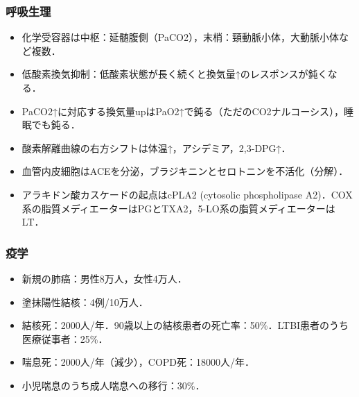 \subsubsection{呼吸生理}
\begin{itemize}

\item 化学受容器は中枢：延髄腹側（PaCO2），末梢：頸動脈小体，大動脈小体など複数．
\item 低酸素換気抑制：低酸素状態が長く続くと換気量↑のレスポンスが鈍くなる．
\item PaCO2↑に対応する換気量upはPaO2↑で鈍る（ただのCO2ナルコーシス），睡眠でも鈍る．
\item 酸素解離曲線の右方シフトは体温↑，アシデミア，2,3-DPG↑．

\item 血管内皮細胞はACEを分泌，ブラジキニンとセロトニンを不活化（分解）．
\item アラキドン酸カスケードの起点はcPLA2 (cytosolic phospholipase A2)．COX系の脂質メディエーターはPGとTXA2，5-LO系の脂質メディエーターはLT．

\end{itemize}


\subsubsection{疫学}
\begin{itemize}
\item 新規の肺癌：男性8万人，女性4万人．
\item 塗抹陽性結核：4例/10万人．
\item 結核死：2000人/年．90歳以上の結核患者の死亡率：50\%．LTBI患者のうち医療従事者：25\%．
\item 喘息死：2000人/年（減少），COPD死：18000人/年．
\item 小児喘息のうち成人喘息への移行：30\%．


\end{itemize}


